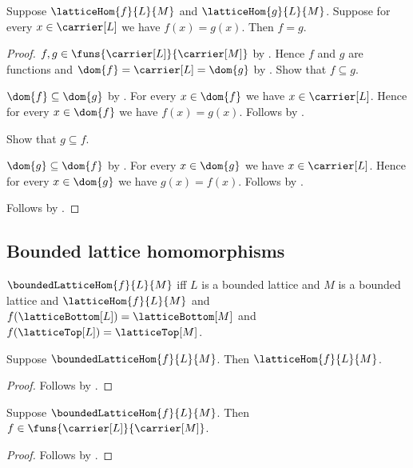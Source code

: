 \begin{theorem}\label{lattice_hom_extensionality}
    Suppose $\latticeHom{f}{L}{M}$ and $\latticeHom{g}{L}{M}$.
    Suppose for every $x\in\carrier[L]$ we have $f(x)=g(x)$.
    Then $f=g$.
\end{theorem}
\begin{proof}
    $f,g\in\funs{\carrier[L]}{\carrier[M]}$ by
        .
    Hence $f$ and $g$ are functions and
        $\dom{f}=\carrier[L]=\dom{g}$ by
        .
    Show that $f\subseteq g$.
    \begin{subproof}
        $\dom{f}\subseteq\dom{g}$ by .
        For every $x\in\dom{f}$ we have $x\in\carrier[L]$.
        Hence for every $x\in\dom{f}$ we have $f(x)=g(x)$.
        Follows by .
    \end{subproof}
    Show that $g\subseteq f$.
    \begin{subproof}
        $\dom{g}\subseteq\dom{f}$ by .
        For every $x\in\dom{g}$ we have $x\in\carrier[L]$.
        Hence for every $x\in\dom{g}$ we have $g(x)=f(x)$.
        Follows by .
    \end{subproof}
    Follows by .
\end{proof}

\subsection{Bounded lattice homomorphisms}

\begin{definition}\label{bounded_lattice_hom}
    $\boundedLatticeHom{f}{L}{M}$ iff
        $L$ is a bounded lattice and $M$ is a bounded lattice and
        $\latticeHom{f}{L}{M}$ and
        $f(\latticeBottom[L])=\latticeBottom[M]$ and
        $f(\latticeTop[L])=\latticeTop[M]$.
\end{definition}

\begin{proposition}\label{bounded_lattice_hom_is_lattice_hom}
    Suppose $\boundedLatticeHom{f}{L}{M}$.
    Then $\latticeHom{f}{L}{M}$.
\end{proposition}
\begin{proof}
    Follows by .
\end{proof}

\begin{proposition}\label{bounded_lattice_hom_type}
    Suppose $\boundedLatticeHom{f}{L}{M}$.
    Then $f\in\funs{\carrier[L]}{\carrier[M]}$.
\end{proposition}
\begin{proof}
    Follows by
        .
\end{proof}

